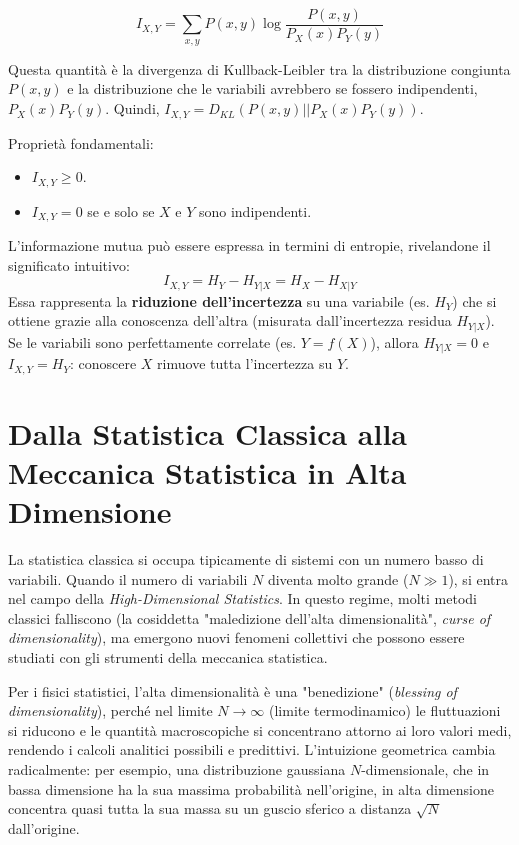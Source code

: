 \begin{equation}
I_{X,Y} = \sum_{x,y} P(x,y) \log \frac{P(x,y)}{P_X(x) P_Y(y)}
\end{equation}

Questa quantità è la divergenza di Kullback-Leibler tra la distribuzione congiunta $P(x,y)$ e la distribuzione che le variabili avrebbero se fossero indipendenti, $P_X(x) P_Y(y)$. Quindi, $I_{X,Y} = D_{KL}(P(x,y) || P_X(x) P_Y(y))$.

Proprietà fondamentali:
\begin{itemize}
    \item $I_{X,Y} \ge 0$.
    \item $I_{X,Y} = 0$ se e solo se $X$ e $Y$ sono indipendenti.
\end{itemize}

L'informazione mutua può essere espressa in termini di entropie, rivelandone il significato intuitivo:
\begin{equation}
I_{X,Y} = H_Y - H_{Y|X} = H_X - H_{X|Y}
\end{equation}
Essa rappresenta la \textbf{riduzione dell'incertezza} su una variabile (es. $H_Y$) che si ottiene grazie alla conoscenza dell'altra (misurata dall'incertezza residua $H_{Y|X}$). Se le variabili sono perfettamente correlate (es. $Y=f(X)$), allora $H_{Y|X}=0$ e $I_{X,Y}=H_Y$: conoscere $X$ rimuove tutta l'incertezza su $Y$.

\vspace{2cm}
\section*{Dalla Statistica Classica alla Meccanica Statistica in Alta Dimensione}

La statistica classica si occupa tipicamente di sistemi con un numero basso di variabili. Quando il numero di variabili $N$ diventa molto grande ($N \gg 1$), si entra nel campo della \textit{High-Dimensional Statistics}. In questo regime, molti metodi classici falliscono (la cosiddetta "maledizione dell'alta dimensionalità", \textit{curse of dimensionality}), ma emergono nuovi fenomeni collettivi che possono essere studiati con gli strumenti della meccanica statistica.

Per i fisici statistici, l'alta dimensionalità è una "benedizione" (\textit{blessing of dimensionality}), perché nel limite $N \to \infty$ (limite termodinamico) le fluttuazioni si riducono e le quantità macroscopiche si concentrano attorno ai loro valori medi, rendendo i calcoli analitici possibili e predittivi. L'intuizione geometrica cambia radicalmente: per esempio, una distribuzione gaussiana $N$-dimensionale, che in bassa dimensione ha la sua massima probabilità nell'origine, in alta dimensione concentra quasi tutta la sua massa su un guscio sferico a distanza $\sqrt{N}$ dall'origine.

